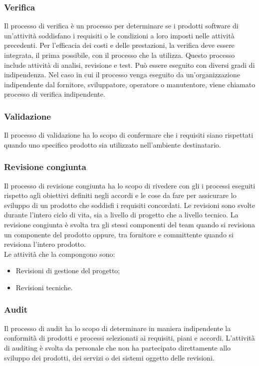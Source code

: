 \subsubsection{Verifica}
Il processo di verifica è un processo per determinare se i prodotti software di un'attività soddisfano i requisiti o le condizioni a loro imposti nelle attività precedenti. Per l'efficacia dei costi e delle prestazioni, la verifica deve essere integrata, il prima possibile, con il processo che la utilizza. Questo processo include attività di analisi, revisione e test. Può essere eseguito con diversi gradi di indipendenza. Nel caso in cui il processo venga eseguito da un'organizzazione indipendente dal fornitore, sviluppatore, operatore o manutentore, viene chiamato processo di verifica indipendente.

\subsubsection{Validazione}
Il processo di validazione ha lo scopo di confermare che i requisiti siano rispettati quando uno specifico prodotto sia utilizzato nell'ambiente destinatario.

\subsubsection{Revisione congiunta}
Il processo di revisione congiunta ha lo scopo di rivedere con gli  i processi eseguiti rispetto agli obiettivi definiti negli accordi e le cose da fare per assicurare lo sviluppo di un prodotto che soddisfi i requisiti concordati.
Le revisioni sono svolte durante l'intero ciclo di vita, sia a livello di progetto che a livello tecnico.
La revisione congiunta è svolta tra gli stessi componenti del team quando si revisiona un componente del prodotto oppure, tra fornitore e committente quando si revisiona l'intero prodotto. \\
Le attività che la compongono sono:
\begin{itemize}

	\item Revisioni di gestione del progetto;
	
	\item Revisioni tecniche.

\end{itemize}

\subsubsection{Audit}
Il processo di audit ha lo scopo di determinare in maniera indipendente la conformità di prodotti e processi selezionati ai requisiti, piani e accordi. L'attività di auditing è svolta da personale che non ha partecipato direttamente allo sviluppo dei prodotti, dei servizi o dei sistemi oggetto delle revisioni.

